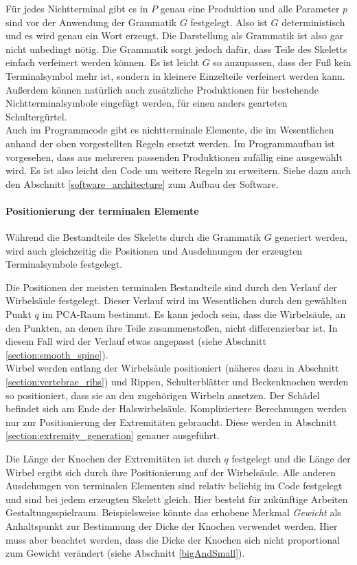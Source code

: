 Für jedes Nichtterminal gibt es in $P$ genau eine Produktion und alle Parameter $p$ sind vor der Anwendung der Grammatik $G$ festgelegt. Also ist $G$ deterministisch und es wird genau ein Wort erzeugt. Die Darstellung als Grammatik ist also gar nicht unbedingt nötig. Die Grammatik sorgt jedoch dafür, dass Teile des Skeletts einfach verfeinert werden können. Es ist \zb leicht $G$ so anzupassen, dass der Fuß kein Terminalsymbol mehr ist, sondern in kleinere Einzelteile verfeinert werden kann. Außerdem können natürlich auch zusätzliche Produktionen für bestehende Nichtterminalsymbole eingefügt werden, \zb für einen anders gearteten Schultergürtel.\\
Auch im Programmcode gibt es nichtterminale Elemente, die im Wesentlichen anhand der oben vorgestellten Regeln ersetzt werden. Im Programmaufbau ist vorgesehen, dass aus mehreren passenden Produktionen zufällig eine ausgewählt wird. Es ist also leicht den Code um weitere Regeln zu erweitern. Siehe dazu auch den Abschnitt \ref{software_architecture} zum Aufbau der Software.

\paragraph{Positionierung der terminalen Elemente}
Während die Bestandteile des Skeletts durch die Grammatik $G$ generiert werden, wird auch gleichzeitig die Positionen und Ausdehnungen der erzeugten Terminalsymbole festgelegt.

Die Positionen der meisten terminalen Bestandteile sind durch den Verlauf der Wirbelsäule festgelegt. Dieser Verlauf wird im Wesentlichen durch den gewählten Punkt $q$ im PCA-Raum bestimmt. Es kann jedoch sein, dass die Wirbelsäule, an den Punkten, an denen ihre Teile zusammenstoßen, nicht differenzierbar ist. In diesem Fall wird der Verlauf etwas angepasst (siehe Abschnitt \ref{section:smooth_spine}).\\
Wirbel werden entlang der Wirbelsäule positioniert (näheres dazu in Abschnitt \ref{section:vertebrae_ribs}) und Rippen, Schulterblätter und Beckenknochen werden so positioniert, dass sie an den zugehörigen Wirbeln ansetzen. Der Schädel befindet sich am Ende der Halswirbelsäule. Kompliziertere Berechnungen werden nur zur Positionierung der Extremitäten gebraucht. Diese werden in Abschnitt \ref{section:extremity_generation} genauer ausgeführt.

Die Länge der Knochen der Extremitäten ist durch $q$ festgelegt und die Länge der Wirbel ergibt sich durch ihre Positionierung auf der Wirbelsäule. Alle anderen Ausdehungen von terminalen Elementen sind relativ beliebig im Code festgelegt und sind bei jedem erzeugten Skelett gleich. Hier besteht für zukünftige Arbeiten Gestaltungsspielraum. Beispielsweise könnte das erhobene Merkmal \emph{Gewicht} als Anhaltspunkt zur Bestimmung der Dicke der Knochen verwendet werden. Hier muss aber beachtet werden, dass die Dicke der Knochen sich nicht proportional zum Gewicht verändert (siehe Abschnitt \ref{bigAndSmall}). 


